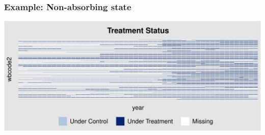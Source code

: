 \documentclass[12pt,aspectratio=169]{beamer}\usepackage[]{graphicx}\usepackage[]{xcolor}
\makeatletter
\def\maxwidth{ %
  \ifdim\Gin@nat@width>\linewidth
    \linewidth
  \else
    \Gin@nat@width
  \fi
}
\newenvironment{knitrout}{}{} %
\makeatother
\begin{document}
\begin{frame}[fragile]
    \frametitle{Example: Non-absorbing state}
    \scriptsize
\begin{knitrout}
\color{fgcolor}

{\centering \includegraphics[width=\maxwidth]{figure/unnamed-chunk-6-1} 

}


\end{knitrout}
     

\end{frame}
\end{document}
